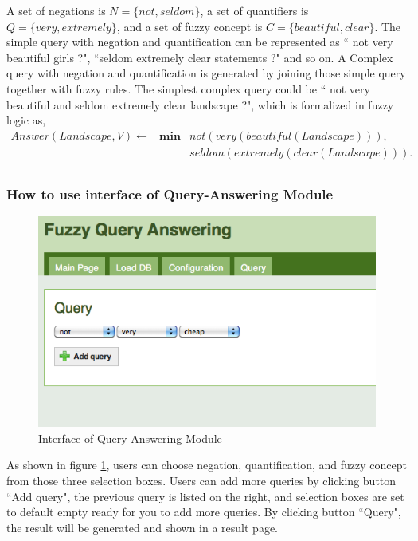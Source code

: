 \begin{ex}
A set of negations is $N=\{not, seldom\}$, a set of quantifiers is $Q=\{very, extremely\}$, and a set of fuzzy concept is $C=\{beautiful, clear\}$. The simple query with negation and quantification can be represented as `` not very beautiful girls ?", ``seldom extremely clear statements ?" and so on. A Complex query with negation and quantification is generated by joining those simple query together with fuzzy rules. The simplest complex query could be `` not very beautiful and seldom extremely clear landscape ?", which is formalized in fuzzy logic as,
\begin{align*}
Answer(Landscape, V) {\longleftarrow} & \textbf{min} & not(very(beautiful(Landscape))),\\ 
&  & seldom(extremely(clear(Landscape))). \\
\end{align*}
\end{ex}

\subsubsection{How to use interface of Query-Answering Module}
\begin{figure}[htb]
\begin{center}
\leavevmode
\includegraphics[scale=0.7]{Query.png}
\end{center}
\caption{Interface of Query-Answering Module}
\label{fig:QAMI}
\end{figure}
As shown in figure \ref{fig:QAMI}, users can choose negation, quantification, and fuzzy concept from  those three selection boxes. Users can add more queries by clicking button ``Add query", the previous query is listed on the right, and selection boxes are set to default empty ready for you to add more queries. By clicking button ``Query", the result will be generated and shown in a result page.